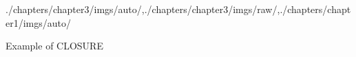 \begin{graphicspathcontext}{{./chapters/chapter3/imgs/auto/},{./chapters/chapter3/imgs/raw/},{./chapters/chapter1/imgs/auto/}}
\begin{bibunit}[apalike]
\begin{frame}[t]{Example of CLOSURE}
	\begin{center}\scriptsize
		\vspace{-.5cm}\begin{minipage}{.4\linewidth}\begin{bnf}
			 \\
			 \\
			 \\
			 \\
			 \\
			 \\
		\end{bnf}\end{minipage}
	\end{center}
	\begin{scriptsize}
\end{scriptsize}
\end{frame}
\end{bibunit}
\end{graphicspathcontext}
